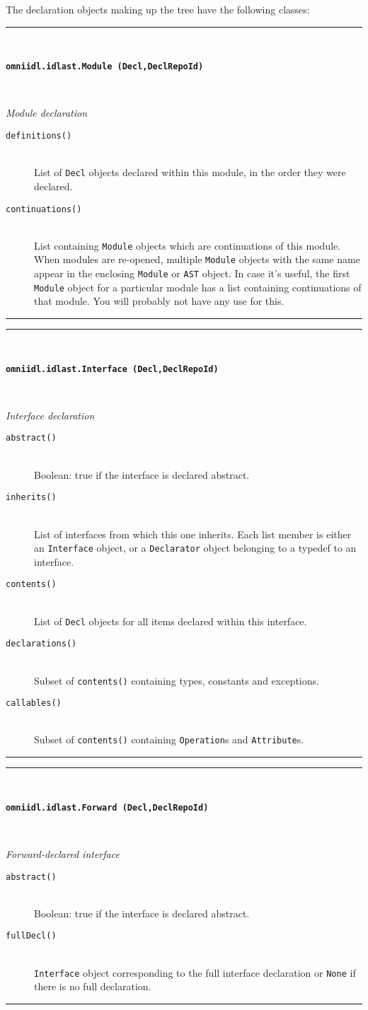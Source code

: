 \documentclass[11pt,twoside,a4paper]{article}
\newcommand{\func}[1]{\texttt{#1}}
\newcommand{\var}[1]{\texttt{#1}}
\newcommand{\class}[1]{\texttt{#1}}
\newcommand{\dfunc}[1]{\item[\func{#1}]\mbox{}\\}
\newenvironment{classdesc}[2]%
  {\vspace{\baselineskip}%
   \noindent\begin{minipage}{\textwidth}%
   \noindent\rule{\textwidth}{1.5pt}\\%
   \centerline{\textbf{\texttt{#1}}}\\%
   \centerline{\textit{#2}}%
   \vspace{-.5\baselineskip}%
   \begin{description}}
  {\vspace{-\baselineskip}\end{description}%
   \noindent\rule{\textwidth}{1.5pt}\end{minipage}}
\begin{document}
The declaration objects making up the tree have the following classes:

\begin{classdesc}
  {omniidl.idlast.Module (Decl,DeclRepoId)}
  {Module declaration}

\dfunc{definitions()}
  List of \class{Decl} objects declared within this module, in the
  order they were declared.

\dfunc{continuations()}
  List containing \class{Module} objects which are continuations of
  this module.  When modules are re-opened, multiple \class{Module}
  objects with the same name appear in the enclosing \class{Module} or
  \class{AST} object. In case it's useful, the first \class{Module}
  object for a particular module has a list containing continuations
  of that module. You will probably not have any use for this.

\end{classdesc}


\begin{classdesc}
  {omniidl.idlast.Interface (Decl,DeclRepoId)}
  {Interface declaration}

\dfunc{abstract()}
  Boolean: true if the interface is declared abstract.

\dfunc{inherits()}
  List of interfaces from which this one inherits. Each list member is
  either an \class{Interface} object, or a \class{Declarator} object
  belonging to a typedef to an interface.

\dfunc{contents()}
  List of \class{Decl} objects for all items declared within this
  interface.

\dfunc{declarations()}
  Subset of \func{contents()} containing types, constants and
  exceptions.

\dfunc{callables()}
  Subset of \func{contents()} containing \class{Operation}s and
  \class{Attribute}s.

\end{classdesc}


\begin{classdesc}
  {omniidl.idlast.Forward (Decl,DeclRepoId)}
  {Forward-declared interface}

\dfunc{abstract()}
  Boolean: true if the interface is declared abstract.

\dfunc{fullDecl()}
  \class{Interface} object corresponding to the full interface
  declaration or \var{None} if there is no full declaration.

\end{classdesc}
\end{document}
